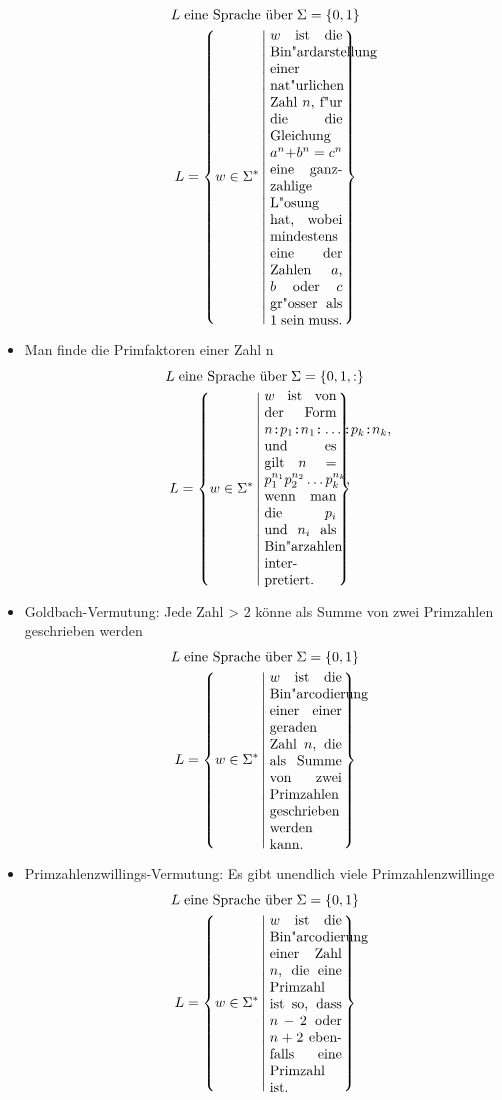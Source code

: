 \begin{itemize}
            \begin{align*}
                L\; & \text{eine Sprache über} \; \Sigma = \{0,1\} \\
        L &= \left\{ w \in \Sigma^* \left|\; 
        \begin{minipage}{0.15\textwidth}
       $w$ ist die Bin"ardarstellung einer nat"urlichen Zahl $n$, f"ur die die Gleichung $a^n+b^n=c^n$ eine ganzzahlige L"osung hat, wobei mindestens eine der Zahlen $a$, $b$ oder $c$ gr"osser als $1$ sein muss.
        \end{minipage} \right. \right\} 
    \end{align*} 
    \item Man finde die Primfaktoren einer Zahl n
                \begin{align*}
                L\; & \text{eine Sprache über} \; \Sigma = \{0,1,:\} \\
        L &= \left\{ w \in \Sigma^* \left|\; 
        \begin{minipage}{0.15\textwidth}
            $w$ ist von der Form $n\texttt{:}p_1\texttt{:}n_1\texttt{:}\dots\texttt{:}p_k\texttt{:}n_k$, und es gilt $n=p_1^{n_1}p_2^{n_2}\dots p_k^{n_k}$, wenn man die $p_i$ und $n_i$ als Bin"arzahlen interpretiert.
        \end{minipage} \right. \right\} 
    \end{align*}
    \item Goldbach-Vermutung: Jede Zahl > 2 könne als Summe von zwei Primzahlen geschrieben werden
    \begin{align*}
        L\; & \text{eine Sprache über} \; \Sigma = \{0,1\} \\
        L &= \left\{ w \in \Sigma^* \left|\; 
        \begin{minipage}{0.15\textwidth}
        $w$ ist die Bin"arcodierung einer einer geraden Zahl $n$, die als Summe von zwei Primzahlen geschrieben werden kann.
        \end{minipage} \right. \right\}         
    \end{align*}
    \item Primzahlenzwillings-Vermutung: Es gibt unendlich viele Primzahlenzwillinge
    \begin{align*}
                L\; & \text{eine Sprache über} \; \Sigma = \{0,1\} \\
        L &= \left\{ w \in \Sigma^* \left|\; 
        \begin{minipage}{0.15\textwidth}
            $w$ ist die Bin"arcodierung einer Zahl $n$, die eine Primzahl ist so, dass $n-2$ oder $n+2$ ebenfalls eine Primzahl ist.
        \end{minipage} \right. \right\}          
    \end{align*}
\end{itemize}